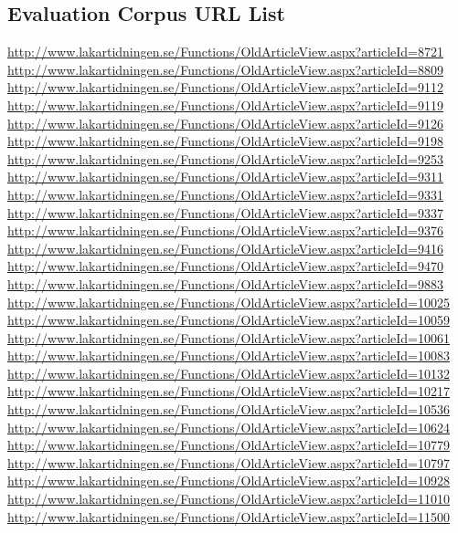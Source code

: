 \documentclass[a4paper]{report}
\begin{document}
\begin{appendices}

\chapter{Evaluation Corpus URL List}
\label{chap:eval-corp-links}
\begin{footnotesize}

\url{http://www.lakartidningen.se/Functions/OldArticleView.aspx?articleId=8721}
\url{http://www.lakartidningen.se/Functions/OldArticleView.aspx?articleId=8809}
\url{http://www.lakartidningen.se/Functions/OldArticleView.aspx?articleId=9112}
\url{http://www.lakartidningen.se/Functions/OldArticleView.aspx?articleId=9119}
\url{http://www.lakartidningen.se/Functions/OldArticleView.aspx?articleId=9126}
\url{http://www.lakartidningen.se/Functions/OldArticleView.aspx?articleId=9198}
\url{http://www.lakartidningen.se/Functions/OldArticleView.aspx?articleId=9253}
\url{http://www.lakartidningen.se/Functions/OldArticleView.aspx?articleId=9311}
\url{http://www.lakartidningen.se/Functions/OldArticleView.aspx?articleId=9331}
\url{http://www.lakartidningen.se/Functions/OldArticleView.aspx?articleId=9337}
\url{http://www.lakartidningen.se/Functions/OldArticleView.aspx?articleId=9376}
\url{http://www.lakartidningen.se/Functions/OldArticleView.aspx?articleId=9416}
\url{http://www.lakartidningen.se/Functions/OldArticleView.aspx?articleId=9470}
\url{http://www.lakartidningen.se/Functions/OldArticleView.aspx?articleId=9883}
\url{http://www.lakartidningen.se/Functions/OldArticleView.aspx?articleId=10025}
\url{http://www.lakartidningen.se/Functions/OldArticleView.aspx?articleId=10059}
\url{http://www.lakartidningen.se/Functions/OldArticleView.aspx?articleId=10061}
\url{http://www.lakartidningen.se/Functions/OldArticleView.aspx?articleId=10083}
\url{http://www.lakartidningen.se/Functions/OldArticleView.aspx?articleId=10132}
\url{http://www.lakartidningen.se/Functions/OldArticleView.aspx?articleId=10217}
\url{http://www.lakartidningen.se/Functions/OldArticleView.aspx?articleId=10536}
\url{http://www.lakartidningen.se/Functions/OldArticleView.aspx?articleId=10624}
\url{http://www.lakartidningen.se/Functions/OldArticleView.aspx?articleId=10779}
\url{http://www.lakartidningen.se/Functions/OldArticleView.aspx?articleId=10797}
\url{http://www.lakartidningen.se/Functions/OldArticleView.aspx?articleId=10928}
\url{http://www.lakartidningen.se/Functions/OldArticleView.aspx?articleId=11010}
\url{http://www.lakartidningen.se/Functions/OldArticleView.aspx?articleId=11500}

\end{footnotesize}
\end{appendices}
\end{document}
